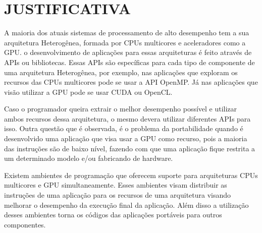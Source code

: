 
\chapter{JUSTIFICATIVA}
\label{chap:justificativa}

A maioria dos atuais sistemas de processamento de alto desempenho tem a sua arquitetura Heterogênea, formada por CPUs multicores e aceleradores como a GPU. o desenvolvimento de aplicações para essas arquiteturas é feito através de APIs ou bibliotecas. Essas APIs são específicas para cada tipo de componente de uma arquitetura Heterogênea, por exemplo, nas aplicações que exploram os recursos das CPUs multicores pode se usar a API OpenMP. Já nas aplicações que visão utilizar a GPU pode se usar CUDA ou OpenCL.

Caso o programador queira extrair o melhor desempenho possível e utilizar ambos recursos dessa arquitetura, o mesmo devera utilizar diferentes APIs para isso. Outra questão que é observada, é o problema da portabilidade quando é desenvolvido uma aplicação que visa usar a GPU como recurso, pois a maioria das instruções são de baixo nível, fazendo com que uma aplicação fique restrita a um determinado modelo e/ou fabricando de hardware.

Existem ambientes de programação que oferecem suporte para arquiteturas CPUs multicores e GPU simultaneamente. Esses ambientes visam distribuir as instruções de uma aplicação para os recursos de uma arquitetura visando melhorar o desempenho da execução final da aplicação. Além disso a utilização desses ambientes torna os códigos das aplicações portáveis para outros componentes.
